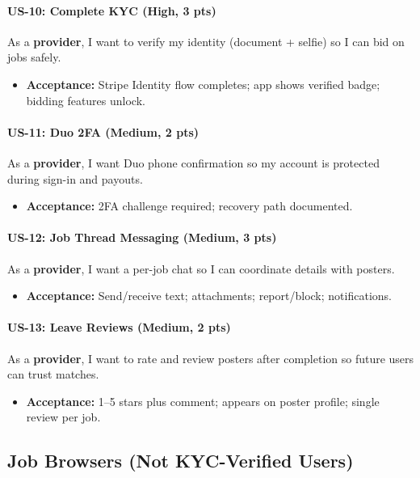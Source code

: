 \documentclass[11pt]{article}
\begin{document}
\paragraph{US-10: Complete KYC (High, 3 pts)}
As a \textbf{provider}, I want to verify my identity (document + selfie) so I can bid on jobs safely.
\begin{itemize}[leftmargin=1.4em]
  \item \textbf{Acceptance:} Stripe Identity flow completes; app shows verified badge; bidding features unlock.
\end{itemize}

\paragraph{US-11: Duo 2FA (Medium, 2 pts)}
As a \textbf{provider}, I want Duo phone confirmation so my account is protected during sign-in and payouts.
\begin{itemize}[leftmargin=1.4em]
  \item \textbf{Acceptance:} 2FA challenge required; recovery path documented.
\end{itemize}

\paragraph{US-12: Job Thread Messaging (Medium, 3 pts)}
As a \textbf{provider}, I want a per-job chat so I can coordinate details with posters.
\begin{itemize}[leftmargin=1.4em]
  \item \textbf{Acceptance:} Send/receive text; attachments; report/block; notifications.
\end{itemize}

\paragraph{US-13: Leave Reviews (Medium, 2 pts)}
As a \textbf{provider}, I want to rate and review posters after completion so future users can trust matches.
\begin{itemize}[leftmargin=1.4em]
  \item \textbf{Acceptance:} 1–5 stars plus comment; appears on poster profile; single review per job.
\end{itemize}

\subsection*{Job Browsers (Not KYC-Verified Users)}
\end{document}
